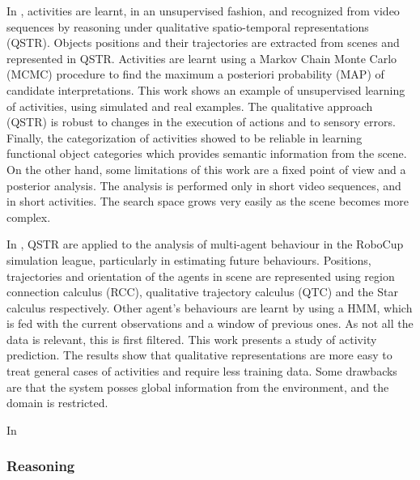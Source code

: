 In \citep{Sridhar10_PhD_UnsupervisedLearningEvent}, activities are learnt, in an unsupervised fashion, and recognized from video sequences by reasoning under qualitative spatio-temporal representations (QSTR). 
Objects positions and their trajectories are extracted from scenes and represented in QSTR.
Activities are learnt using a Markov Chain Monte Carlo (MCMC) procedure to find the maximum a posteriori probability (MAP) of candidate interpretations.
This work shows an example of unsupervised learning of activities, using simulated and real examples.
The qualitative approach (QSTR) is robust to changes in the execution of actions and to sensory errors.
Finally, the categorization of activities showed to be reliable in learning functional object categories which provides semantic information from the scene.
On the other hand, some limitations of this work are a fixed point of view and a posterior analysis.
The analysis is performed only in short video sequences, and in short activities.
The search space grows very easily as the scene becomes more complex.

In \citep{Young13_PredcitingSituatedBehaviour,Young14_EffectsTraining}, QSTR are applied to the analysis of multi-agent behaviour in the RoboCup simulation league, particularly in estimating future behaviours. 
Positions, trajectories and orientation of the agents in scene are represented using region connection calculus (RCC), qualitative trajectory calculus (QTC) and the Star calculus respectively. 
Other agent's behaviours are learnt by using a HMM, which is fed with the current observations and a window of previous ones. 
As not all the data is relevant, this is first filtered. 
This work presents a study of activity prediction.
The results show that qualitative representations are more easy to treat general cases of activities and require less training data. 
Some drawbacks are that the system posses global information from the environment, and the domain is restricted.

In


\subsubsection{Reasoning}






